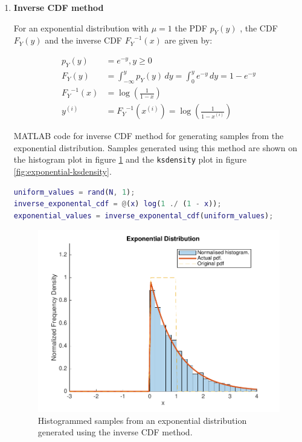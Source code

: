 \documentclass[12pt]{article}
\newcommand{\code}[1]{\texttt{#1}}
\begin{document}
\begin{enumerate}
\item{\bf Inverse CDF method} 



For an exponential distribution with $\mu = 1$ the PDF $p_Y(y)$ , the CDF $F_Y(y)$ and the inverse CDF ${F_Y}^{-1}(x)
$ are given by:


\begin{align*}
p_Y(y)  &= e ^ {-y}, y \ge 0
\\ F_Y (y) &= \int _ {- \infty} ^ y p_Y (y) \, dy =  \int _ 0 ^ y e ^ {-y} \, dy = 1 - e ^ {-y}
\\ {F_Y} ^ {-1} (x) &= \log {\left( \frac 1 {1 - x} \right)}
\\ y^{(i)} &= {F_Y} ^ {-1} (x ^ {(i)}) = \log \left(\frac 1 {1 - x ^ {(i)}}  \right)
\end{align*}


MATLAB code for inverse CDF method for generating samples from the exponential distribution. Samples generated using this method are shown on the histogram plot in figure \ref{fig:exponential-histogram} and the \code{ksdensity} plot in figure \ref{fig:exponential-ksdensity}.

\begin{lstlisting}[language=MATLAB]
uniform_values = rand(N, 1);
inverse_exponental_cdf = @(x) log(1 ./ (1 - x));
exponential_values = inverse_exponental_cdf(uniform_values);
\end{lstlisting}


\begin{figure}[H]
\includegraphics[width=\textwidth]{figures/exponential-histogram.pdf}
  \caption{Histogrammed samples from an exponential distribution generated using the inverse CDF method. }
  \label{fig:exponential-histogram}
\end{figure}


\end{enumerate}
\end{document}
